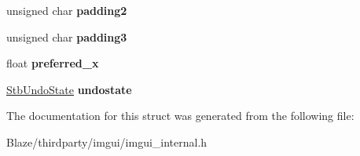 \begin{DoxyCompactItemize}
unsigned char {\bfseries padding2}
\item 
\mbox{\label{structImStb_1_1STB__TexteditState_a34bc85d7c53b0b138dec9d2221848257}} 
unsigned char {\bfseries padding3}
\item 
\mbox{\label{structImStb_1_1STB__TexteditState_a7c252328de4797d8f0102dabfd71f87a}} 
float {\bfseries preferred\+\_\+x}
\item 
\mbox{\label{structImStb_1_1STB__TexteditState_a46ad65e4289762da51bd7d6d2716842f}} 
\hyperlink{structImStb_1_1StbUndoState}{Stb\+Undo\+State} {\bfseries undostate}
\end{DoxyCompactItemize}


The documentation for this struct was generated from the following file\+:\begin{DoxyCompactItemize}
\item 
Blaze/thirdparty/imgui/imgui\+\_\+internal.\+h\end{DoxyCompactItemize}
